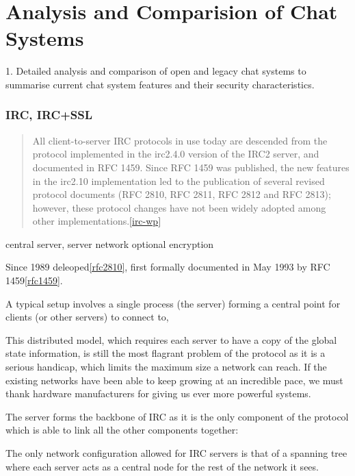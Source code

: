 \chapter{Analysis and Comparision of Chat Systems}

    1. Detailed analysis and comparison of open and legacy chat systems
        to summarise current chat system features and their
        security characteristics.


\subsection{IRC, IRC+SSL}
\begin{quote}
All client-to-server IRC protocols in use today are descended from the protocol implemented in the irc2.4.0 version of the IRC2 server, and documented in RFC 1459. Since RFC 1459 was published, the new features in the irc2.10 implementation led to the publication of several revised protocol documents (RFC 2810, RFC 2811, RFC 2812 and RFC 2813); however, these protocol changes have not been widely adopted among other implementations.\ref{irc-wp}
\end{quote}

central server, server network
optional encryption

Since 1989 deleoped\ref{rfc2810},
first formally documented in May 1993 by RFC 1459\ref{rfc1459}.

A typical setup involves a single process (the server) forming a
      central point for clients (or other servers) to connect to,
      
   This distributed model, which requires each server to have a copy
   of the global state information, is still the most flagrant problem
   of the protocol as it is a serious handicap, which limits the maximum
   size a network can reach.  If the existing networks have been able to
   keep growing at an incredible pace, we must thank hardware
   manufacturers for giving us ever more powerful systems.

The server forms the backbone of IRC as it is the only component
   of the protocol which is able to link all the other components
   together:


   The only network configuration allowed for IRC servers is that of
   a spanning tree where each server acts as a central node for the rest
   of the network it sees.


